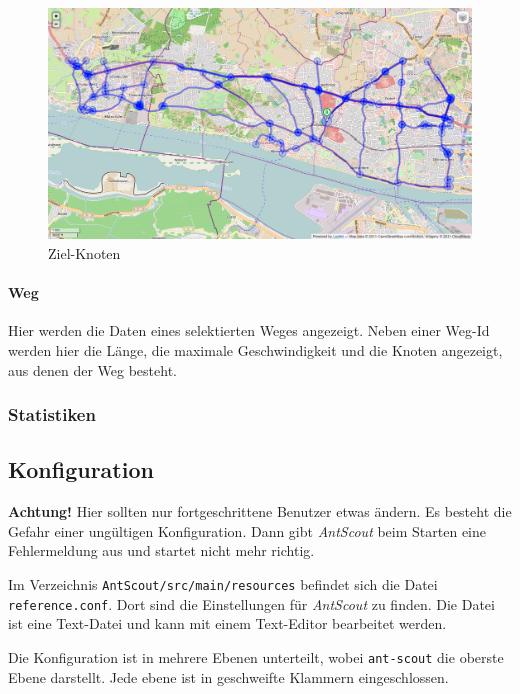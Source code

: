 \documentclass[a4paper,10pt]{scrreprt}
\begin{document}
\begin{figure}[htbp]
  \centering
  \includegraphics[width=\textwidth]{Bilder/Ziel-Knoten.png}
  \caption{Ziel-Knoten}
  \label{fig:ziel-knoten}
\end{figure}

\paragraph{Weg}
\label{sec:weg}

Hier werden die Daten eines selektierten Weges angezeigt.
Neben einer Weg-Id werden hier die Länge, die maximale Geschwindigkeit und die Knoten angezeigt, aus denen der Weg besteht.

\subsubsection{Statistiken}
\label{sec:statistiken}

\subsection{Konfiguration}
\label{sec:konfiguration}

\textbf{Achtung!}
Hier sollten nur fortgeschrittene Benutzer etwas ändern.
Es besteht die Gefahr einer ungültigen Konfiguration.
Dann gibt \textit{AntScout} beim Starten eine Fehlermeldung aus und startet nicht mehr richtig.

Im Verzeichnis \texttt{AntScout/src/main/resources} befindet sich die Datei \texttt{reference.conf}.
Dort sind die Einstellungen für \textit{AntScout} zu finden.
Die Datei ist eine Text-Datei und kann mit einem Text-Editor bearbeitet werden.

Die Konfiguration ist in mehrere Ebenen unterteilt, wobei \texttt{ant-scout} die oberste Ebene darstellt.
Jede ebene ist in geschweifte Klammern eingeschlossen.
\end{document}
